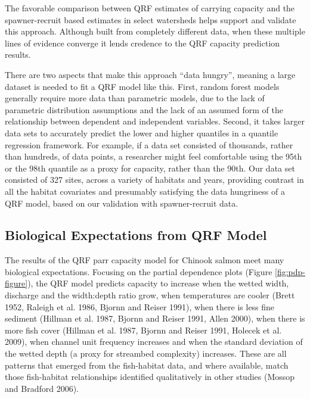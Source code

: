 \documentclass[
  12pt,
]{article}
\begin{document}
The favorable comparison between QRF estimates of carrying capacity and the spawner-recruit based estimates in select watersheds helps support and validate this approach. Although built from completely different data, when these multiple lines of evidence converge it lends credence to the QRF capacity prediction results.

There are two aspects that make this approach ``data hungry'', meaning a large dataset is needed to fit a QRF model like this. First, random forest models generally require more data than parametric models, due to the lack of parametric distribution assumptions and the lack of an assumed form of the relationship between dependent and independent variables. Second, it takes larger data sets to accurately predict the lower and higher quantiles in a quantile regression framework. For example, if a data set consisted of thousands, rather than hundreds, of data points, a researcher might feel comfortable using the 95th or the 98th quantile as a proxy for capacity, rather than the 90th. Our data set consisted of 327 sites, across a variety of habitats and years, providing contrast in all the habitat covariates and presumably satisfying the data hungriness of a QRF model, based on our validation with spawner-recruit data.

\hypertarget{biological-expectations-from-qrf-model}{%
\subsection{Biological Expectations from QRF Model}\label{biological-expectations-from-qrf-model}}

The results of the QRF parr capacity model for Chinook salmon meet many biological expectations. Focusing on the partial dependence plots (Figure \ref{fig:pdp-figure}), the QRF model predicts capacity to increase when the wetted width, discharge and the width:depth ratio grow, when temperatures are cooler (Brett 1952, Raleigh et al. 1986, Bjornn and Reiser 1991), when there is less fine sediment (Hillman et al. 1987, Bjornn and Reiser 1991, Allen 2000), when there is more fish cover (Hillman et al. 1987, Bjornn and Reiser 1991, Holecek et al. 2009), when channel unit frequency increases and when the standard deviation of the wetted depth (a proxy for streambed complexity) increases. These are all patterns that emerged from the fish-habitat data, and where available, match those fish-habitat relationships identified qualitatively in other studies (Mossop and Bradford 2006).
\end{document}
